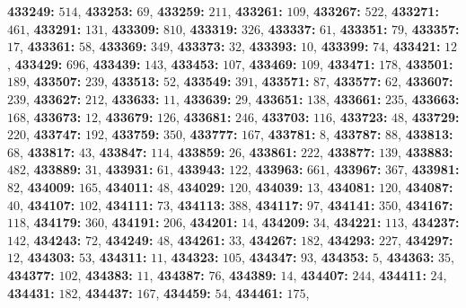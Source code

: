 \textsf{\bfseries 433249:} $514$, \textsf{\bfseries 433253:} $69$, \textsf{\bfseries 433259:} $211$, \textsf{\bfseries 433261:} $109$, \textsf{\bfseries 433267:} $522$, \textsf{\bfseries 433271:} $461$, \textsf{\bfseries 433291:} $131$, \textsf{\bfseries 433309:} $810$, \textsf{\bfseries 433319:} $326$, \textsf{\bfseries 433337:} $61$, \textsf{\bfseries 433351:} $79$, \textsf{\bfseries 433357:} $17$, \textsf{\bfseries 433361:} $58$, \textsf{\bfseries 433369:} $349$, \textsf{\bfseries 433373:} $32$, \textsf{\bfseries 433393:} $10$, \textsf{\bfseries 433399:} $74$, \textsf{\bfseries 433421:} $12$, \textsf{\bfseries 433429:} $696$, \textsf{\bfseries 433439:} $143$, \textsf{\bfseries 433453:} $107$, \textsf{\bfseries 433469:} $109$, \textsf{\bfseries 433471:} $178$, \textsf{\bfseries 433501:} $189$, \textsf{\bfseries 433507:} $239$, \textsf{\bfseries 433513:} $52$, \textsf{\bfseries 433549:} $391$, \textsf{\bfseries 433571:} $87$, \textsf{\bfseries 433577:} $62$, \textsf{\bfseries 433607:} $239$, \textsf{\bfseries 433627:} $212$, \textsf{\bfseries 433633:} $11$, \textsf{\bfseries 433639:} $29$, \textsf{\bfseries 433651:} $138$, \textsf{\bfseries 433661:} $235$, \textsf{\bfseries 433663:} $168$, \textsf{\bfseries 433673:} $12$, \textsf{\bfseries 433679:} $126$, \textsf{\bfseries 433681:} $246$, \textsf{\bfseries 433703:} $116$, \textsf{\bfseries 433723:} $48$, \textsf{\bfseries 433729:} $220$, \textsf{\bfseries 433747:} $192$, \textsf{\bfseries 433759:} $350$, \textsf{\bfseries 433777:} $167$, \textsf{\bfseries 433781:} $8$, \textsf{\bfseries 433787:} $88$, \textsf{\bfseries 433813:} $68$, \textsf{\bfseries 433817:} $43$, \textsf{\bfseries 433847:} $114$, \textsf{\bfseries 433859:} $26$, \textsf{\bfseries 433861:} $222$, \textsf{\bfseries 433877:} $139$, \textsf{\bfseries 433883:} $482$, \textsf{\bfseries 433889:} $31$, \textsf{\bfseries 433931:} $61$, \textsf{\bfseries 433943:} $122$, \textsf{\bfseries 433963:} $661$, \textsf{\bfseries 433967:} $367$, \textsf{\bfseries 433981:} $82$, \textsf{\bfseries 434009:} $165$, \textsf{\bfseries 434011:} $48$, \textsf{\bfseries 434029:} $120$, \textsf{\bfseries 434039:} $13$, \textsf{\bfseries 434081:} $120$, \textsf{\bfseries 434087:} $40$, \textsf{\bfseries 434107:} $102$, \textsf{\bfseries 434111:} $73$, \textsf{\bfseries 434113:} $388$, \textsf{\bfseries 434117:} $97$, \textsf{\bfseries 434141:} $350$, \textsf{\bfseries 434167:} $118$, \textsf{\bfseries 434179:} $360$, \textsf{\bfseries 434191:} $206$, \textsf{\bfseries 434201:} $14$, \textsf{\bfseries 434209:} $34$, \textsf{\bfseries 434221:} $113$, \textsf{\bfseries 434237:} $142$, \textsf{\bfseries 434243:} $72$, \textsf{\bfseries 434249:} $48$, \textsf{\bfseries 434261:} $33$, \textsf{\bfseries 434267:} $182$, \textsf{\bfseries 434293:} $227$, \textsf{\bfseries 434297:} $12$, \textsf{\bfseries 434303:} $53$, \textsf{\bfseries 434311:} $11$, \textsf{\bfseries 434323:} $105$, \textsf{\bfseries 434347:} $93$, \textsf{\bfseries 434353:} $5$, \textsf{\bfseries 434363:} $35$, \textsf{\bfseries 434377:} $102$, \textsf{\bfseries 434383:} $11$, \textsf{\bfseries 434387:} $76$, \textsf{\bfseries 434389:} $14$, \textsf{\bfseries 434407:} $244$, \textsf{\bfseries 434411:} $24$, \textsf{\bfseries 434431:} $182$, \textsf{\bfseries 434437:} $167$, \textsf{\bfseries 434459:} $54$, \textsf{\bfseries 434461:} $175$, 
